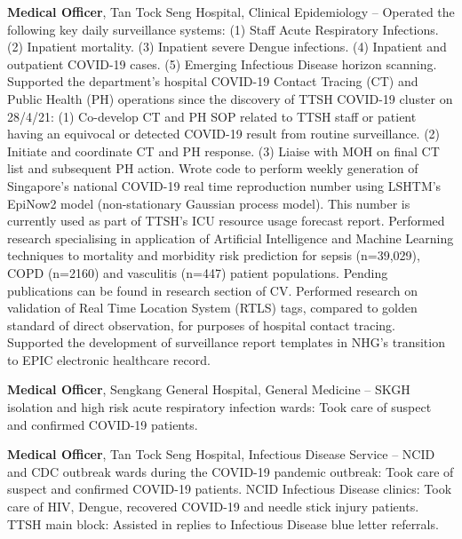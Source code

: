 \documentclass[letterpaper,10pt,oneside]{article}
\begin{document}
\begin{body}
{\textbf{Medical Officer}, Tan Tock Seng Hospital, Clinical Epidemiology}
\hfill
{} --
\BulletItem
Operated the following key daily surveillance systems: (1) Staff Acute Respiratory Infections. (2) Inpatient mortality. (3) Inpatient severe Dengue infections. (4) Inpatient and outpatient COVID-19 cases. (5) Emerging Infectious Disease horizon scanning.
\BulletItem
Supported the department's hospital COVID-19 Contact Tracing (CT) and Public Health (PH) operations since the discovery of TTSH COVID-19 cluster on 28/4/21: (1) Co-develop CT and PH SOP related to TTSH staff or patient having an equivocal or detected COVID-19 result from routine surveillance. (2) Initiate and coordinate CT and PH response. (3) Liaise with MOH on final CT list and subsequent PH action.
\BulletItem
Wrote code to perform weekly generation of Singapore's national COVID-19 real time reproduction number using LSHTM's EpiNow2 model (non-stationary Gaussian process model). This number is currently used as part of TTSH's ICU resource usage forecast report.
\BulletItem
Performed research specialising in application of Artificial Intelligence and Machine Learning techniques to mortality and morbidity risk prediction for sepsis (n=39,029), COPD (n=2160) and vasculitis (n=447) patient populations. Pending publications can be found in research section of CV.
\BulletItem
Performed research on validation of Real Time Location System (RTLS) tags, compared to golden standard of direct observation, for purposes of hospital contact tracing.
\BulletItem
Supported the development of surveillance report templates in NHG's transition to EPIC electronic healthcare record.

\BigGap
{\textbf{Medical Officer}, Sengkang General Hospital, General Medicine}
\hfill
{} --
\BulletItem
SKGH isolation and high risk acute respiratory infection wards: Took care of suspect and confirmed COVID-19 patients.

\BigGap
{\textbf{Medical Officer}, Tan Tock Seng Hospital, Infectious Disease Service}
\hfill
{} --
\BulletItem
NCID and CDC outbreak wards during the COVID-19 pandemic outbreak: Took care of suspect and confirmed COVID-19 patients.
\BulletItem
NCID Infectious Disease clinics: Took care of HIV, Dengue, recovered COVID-19 and needle stick injury patients.
\BulletItem
TTSH main block: Assisted in replies to Infectious Disease blue letter referrals.  


\end{body}
\end{document}
